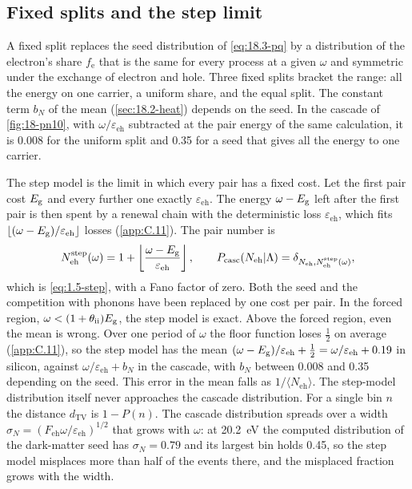 \subsection{Fixed splits and the step limit}\label{sec:18.3-limits}

A fixed split replaces the seed distribution of \cref{eq:18.3-pq} by a distribution of the electron's share $f_{\mathrm{e}}$ that is the same for every process at a given $\omega$ and symmetric under the exchange of electron and hole. Three fixed splits bracket the range: all the energy on one carrier, a uniform share, and the equal split. The constant term $b_N$ of the mean (\cref{sec:18.2-heat}) depends on the seed. In the cascade of \cref{fig:18-pn10}, with $\omega/\varepsilon_{\mathrm{eh}}$ subtracted at the pair energy of the same calculation, it is 0.008 for the uniform split and 0.35 for a seed that gives all the energy to one carrier.

The step model is the limit in which every pair has a fixed cost. Let the first pair cost $E_{\mathrm{g}}$ and every further one exactly $\varepsilon_{\mathrm{eh}}$. The energy $\omega - E_{\mathrm{g}}$ left after the first pair is then spent by a renewal chain with the deterministic loss $\varepsilon_{\mathrm{eh}}$, which fits $\lfloor(\omega - E_{\mathrm{g}})/\varepsilon_{\mathrm{eh}}\rfloor$ losses (\cref{app:C.11}). The pair number is
\begin{equation}
  N_{\mathrm{eh}}^{\mathrm{step}}(\omega) = 1 + \left\lfloor\frac{\omega - E_{\mathrm{g}}}{\varepsilon_{\mathrm{eh}}}\right\rfloor , \qquad P_{\mathrm{casc}}(N_{\mathrm{eh}}|\Lambda) = \delta_{N_{\mathrm{eh}},N_{\mathrm{eh}}^{\mathrm{step}}(\omega)} ,
  \label{eq:18.3-step}
\end{equation}
which is \cref{eq:1.5-step}, with a Fano factor of zero. Both the seed and the competition with phonons have been replaced by one cost per pair. In the forced region, $\omega < (1 + \theta_{\mathrm{ii}})E_{\mathrm{g}}$, the step model is exact. Above the forced region, even the mean is wrong. Over one period of $\omega$ the floor function loses $\tfrac12$ on average (\cref{app:C.11}), so the step model has the mean $(\omega - E_{\mathrm{g}})/\varepsilon_{\mathrm{eh}} + \tfrac12 = \omega/\varepsilon_{\mathrm{eh}} + 0.19$ in silicon, against $\omega/\varepsilon_{\mathrm{eh}} + b_N$ in the cascade, with $b_N$ between 0.008 and 0.35 depending on the seed. This error in the mean falls as $1/\langle N_{\mathrm{eh}}\rangle$. The step-model distribution itself never approaches the cascade distribution. For a single bin $n$ the distance $d_{\mathrm{TV}}$ is $1 - P(n)$. The cascade distribution spreads over a width $\sigma_N = (F_{\mathrm{eh}}\omega/\varepsilon_{\mathrm{eh}})^{1/2}$ that grows with $\omega$: at \SI{20.2}{eV} the computed distribution of the dark-matter seed has $\sigma_N = 0.79$ and its largest bin holds 0.45, so the step model misplaces more than half of the events there, and the misplaced fraction grows with the width.

